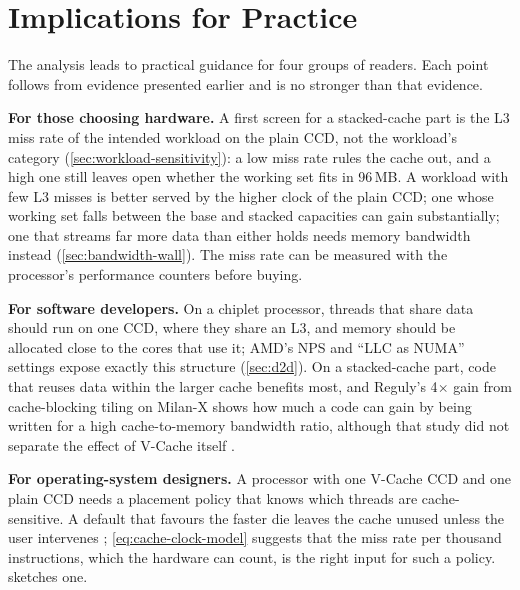 \section{Implications for Practice}
\label{sec:implications}
The analysis leads to practical guidance for four groups of readers. Each point follows from evidence presented earlier and is no stronger than that evidence.

\textbf{For those choosing hardware.} A first screen for a stacked-cache part is the L3 miss rate of the intended workload on the plain CCD, not the workload's category (\cref{sec:workload-sensitivity}): a low miss rate rules the cache out, and a high one still leaves open whether the working set fits in 96\,MB. A workload with few L3 misses is better served by the higher clock of the plain CCD; one whose working set falls between the base and stacked capacities can gain substantially; one that streams far more data than either holds needs memory bandwidth instead (\cref{sec:bandwidth-wall}). The miss rate can be measured with the processor's performance counters before buying.

\textbf{For software developers.} On a chiplet processor, threads that share data should run on one CCD, where they share an L3, and memory should be allocated close to the cores that use it; AMD's NPS and ``LLC as NUMA'' settings expose exactly this structure (\cref{sec:d2d}). On a stacked-cache part, code that reuses data within the larger cache benefits most, and Reguly's 4$\times$ gain from cache-blocking tiling on Milan-X shows how much a code can gain by being written for a high cache-to-memory bandwidth ratio, although that study did not separate the effect of V-Cache itself \cite{regulyComparativeEvaluationBandwidthbound2023}.

\textbf{For operating-system designers.} A processor with one V-Cache CCD and one plain CCD needs a placement policy that knows which threads are cache-sensitive. A default that favours the faster die leaves the cache unused unless the user intervenes \cite{lamAMDs7950X3DZen2023}; \cref{eq:cache-clock-model} suggests that the miss rate per thousand instructions, which the hardware can count, is the right input for such a policy.  sketches one.

